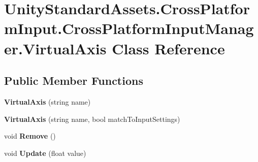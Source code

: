 \hypertarget{class_unity_standard_assets_1_1_cross_platform_input_1_1_cross_platform_input_manager_1_1_virtual_axis}{}\section{Unity\+Standard\+Assets.\+Cross\+Platform\+Input.\+Cross\+Platform\+Input\+Manager.\+Virtual\+Axis Class Reference}
\label{class_unity_standard_assets_1_1_cross_platform_input_1_1_cross_platform_input_manager_1_1_virtual_axis}
\subsection*{Public Member Functions}
\begin{DoxyCompactItemize}
\item 
\mbox{\label{class_unity_standard_assets_1_1_cross_platform_input_1_1_cross_platform_input_manager_1_1_virtual_axis_a051ce3991988d9ff11efe81e73491a68}} 
{\bfseries Virtual\+Axis} (string name)
\item 
\mbox{\label{class_unity_standard_assets_1_1_cross_platform_input_1_1_cross_platform_input_manager_1_1_virtual_axis_a4d1d1be133e80ab963a3ed6e3186971e}} 
{\bfseries Virtual\+Axis} (string name, bool match\+To\+Input\+Settings)
\item 
\mbox{\label{class_unity_standard_assets_1_1_cross_platform_input_1_1_cross_platform_input_manager_1_1_virtual_axis_af4dc5cd83e45dc874b7b659f03cdc926}} 
void {\bfseries Remove} ()
\item 
\mbox{\label{class_unity_standard_assets_1_1_cross_platform_input_1_1_cross_platform_input_manager_1_1_virtual_axis_a53ab054e60e6e33fad9a62283786d962}} 
void {\bfseries Update} (float value)
\end{DoxyCompactItemize}
